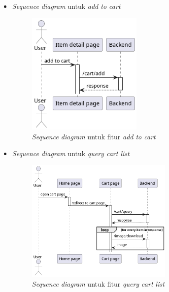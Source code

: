 \documentclass[a4paper]{article}
\begin{document}
\begin{enumerate}
\begin{enumerate}
\begin{itemize}
            \newpage
            \item \textit{Sequence diagram} untuk \textit{add to cart}
            \begin{figure}[h]
                \centering
                \includegraphics*[height=6cm]{diagram/sequence diagram/FE/13. cart/add to cart/template.png}
                \caption{\textit{Sequence diagram} untuk fitur \textit{add to cart}}
            \end{figure}

            \item \textit{Sequence diagram} untuk \textit{query cart list}
            \begin{figure}[h]
                \centering
                \includegraphics*[height=6cm]{diagram/sequence diagram/FE/13. cart/query cart list/template.png}
                \caption{\textit{Sequence diagram} untuk fitur \textit{query cart list}}
            \end{figure}


\end{itemize}
\end{enumerate}
\end{enumerate}
\end{document}
